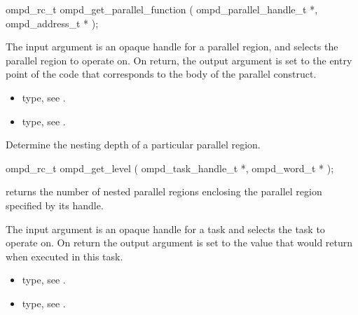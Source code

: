 \format
\begin{cspecific}
\begin{ompSyntax}
ompd_rc_t ompd_get_parallel_function (
  ompd_parallel_handle_t *,
  ompd_address_t *
);
\end{ompSyntax}
\end{cspecific}

\descr

\argdesc
The input argument  is an opaque handle for a
parallel region, and selects the parallel region to operate on.
On return,  the output argument  is set to the
entry point of the code that corresponds to the body of the parallel
construct.

\crossreferences
\begin{itemize}
	\item {} type, see .
	\item {} type, see .
\end{itemize}


\label{subsubsubsec:ompd_get_level}
\summary
Determine the nesting depth of a particular parallel region.

\format
\begin{cspecific}
\begin{ompSyntax}
ompd_rc_t ompd_get_level (
  ompd_task_handle_t *,
  ompd_word_t *
);
\end{ompSyntax}
\end{cspecific}

\descr
{} returns the number of nested
parallel regions enclosing the parallel region specified by its handle.

\argdesc
The input argument  is an opaque handle for a task and selects the task to operate on.
On return the output argument  is set to the value that  would return 
when executed in this task.


\crossreferences
\begin{itemize}
	\item {} type, see .
	\item {} type, see .
\end{itemize}


